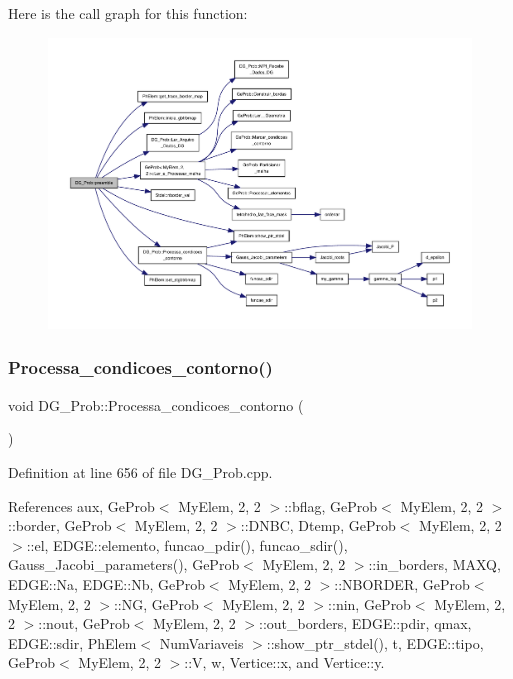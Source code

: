 Here is the call graph for this function\+:
\nopagebreak
\begin{figure}[H]
\begin{center}
\leavevmode
\includegraphics[width=350pt]{classDG__Prob_a43fca83a2395515cd1c0c3083463532d_cgraph}
\end{center}
\end{figure}
\mbox{\label{classDG__Prob_a7933929b9873b4e40fc5152bd746dcf3}} 
\subsubsection{\texorpdfstring{Processa\+\_\+condicoes\+\_\+contorno()}{Processa\_condicoes\_contorno()}}
{\footnotesize\ttfamily void D\+G\+\_\+\+Prob\+::\+Processa\+\_\+condicoes\+\_\+contorno (\begin{DoxyParamCaption}{ }\end{DoxyParamCaption})}



Definition at line 656 of file D\+G\+\_\+\+Prob.\+cpp.



References aux, Ge\+Prob$<$ My\+Elem, 2, 2 $>$\+::bflag, Ge\+Prob$<$ My\+Elem, 2, 2 $>$\+::border, Ge\+Prob$<$ My\+Elem, 2, 2 $>$\+::\+D\+N\+BC, Dtemp, Ge\+Prob$<$ My\+Elem, 2, 2 $>$\+::el, E\+D\+G\+E\+::elemento, funcao\+\_\+pdir(), funcao\+\_\+sdir(), Gauss\+\_\+\+Jacobi\+\_\+parameters(), Ge\+Prob$<$ My\+Elem, 2, 2 $>$\+::in\+\_\+borders, M\+A\+XQ, E\+D\+G\+E\+::\+Na, E\+D\+G\+E\+::\+Nb, Ge\+Prob$<$ My\+Elem, 2, 2 $>$\+::\+N\+B\+O\+R\+D\+ER, Ge\+Prob$<$ My\+Elem, 2, 2 $>$\+::\+NG, Ge\+Prob$<$ My\+Elem, 2, 2 $>$\+::nin, Ge\+Prob$<$ My\+Elem, 2, 2 $>$\+::nout, Ge\+Prob$<$ My\+Elem, 2, 2 $>$\+::out\+\_\+borders, E\+D\+G\+E\+::pdir, qmax, E\+D\+G\+E\+::sdir, Ph\+Elem$<$ Num\+Variaveis $>$\+::show\+\_\+ptr\+\_\+stdel(), t, E\+D\+G\+E\+::tipo, Ge\+Prob$<$ My\+Elem, 2, 2 $>$\+::V, w, Vertice\+::x, and Vertice\+::y.



